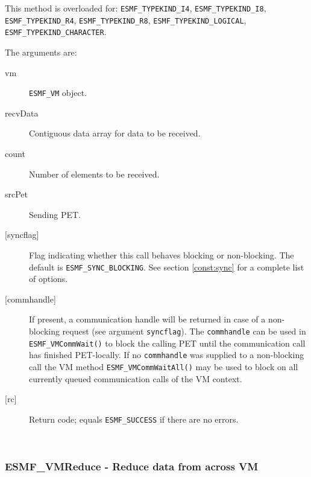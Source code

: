      This method is overloaded for:
     {\tt ESMF\_TYPEKIND\_I4}, {\tt ESMF\_TYPEKIND\_I8},
     {\tt ESMF\_TYPEKIND\_R4}, {\tt ESMF\_TYPEKIND\_R8}, 
     {\tt ESMF\_TYPEKIND\_LOGICAL}, 
     {\tt ESMF\_TYPEKIND\_CHARACTER}.
  
     The arguments are:
     \begin{description}
     \item[vm] 
          {\tt ESMF\_VM} object.
     \item[recvData] 
          Contiguous data array for data to be received.
     \item[count] 
          Number of elements to be received.
     \item[srcPet] 
          Sending PET.
     \item[{[syncflag]}]
          Flag indicating whether this call behaves blocking or non-blocking.
          The default is {\tt ESMF\_SYNC\_BLOCKING}. See section
          \ref{const:sync} for a complete list of options.
     \item[{[commhandle]}]
          If present, a communication handle will be returned in case of a 
          non-blocking request (see argument {\tt syncflag}). The
          {\tt commhandle} can be used in {\tt ESMF\_VMCommWait()} to block the
          calling PET until the communication call has finished PET-locally. If
          no {\tt commhandle} was supplied to a non-blocking call the VM method
          {\tt ESMF\_VMCommWaitAll()} may be used to block on all currently queued
          communication calls of the VM context.
     \item[{[rc]}] 
          Return code; equals {\tt ESMF\_SUCCESS} if there are no errors.
     \end{description}
   
 
\mbox{}\hrulefill\ 
 
\subsubsection [ESMF\_VMReduce] {ESMF\_VMReduce - Reduce data from across VM}



